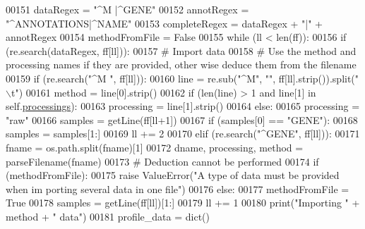 \begin{DoxyCode}
00151         dataRegex = \textcolor{stringliteral}{"^M |^GENE"}
00152         annotRegex = \textcolor{stringliteral}{"^ANNOTATIONS|^NAME"}
00153         completeRegex = dataRegex + \textcolor{stringliteral}{"|"} + annotRegex
00154         methodFromFile = \textcolor{keyword}{False}
00155         \textcolor{keywordflow}{while} (ll < len(ff)):
00156             \textcolor{keywordflow}{if} (re.search(dataRegex, ff[ll])):
00157                 \textcolor{comment}{# Import data}
00158                 \textcolor{comment}{# Use the method and processing names if they are provided, other
      wise deduce them from the filename }
00159                 \textcolor{keywordflow}{if} (re.search(\textcolor{stringliteral}{"^M "}, ff[ll])):
00160                     line = re.sub(\textcolor{stringliteral}{"^M"}, \textcolor{stringliteral}{""}, ff[ll].strip()).split(\textcolor{stringliteral}{"\(\backslash\)t"})
00161                     method = line[0].strip()
00162                     \textcolor{keywordflow}{if} (len(line) > 1 \textcolor{keywordflow}{and} line[1] \textcolor{keywordflow}{in} self.\hyperlink{classnavicom_1_1navicom_1_1NaviCom_a5a255d56e997ddcc653d8f06c741ea13}{processings}):
00163                         processing = line[1].strip()
00164                     \textcolor{keywordflow}{else}:
00165                         processing = \textcolor{stringliteral}{"raw"}
00166                     samples = getLine(ff[ll+1])
00167                     \textcolor{keywordflow}{if} (samples[0] == \textcolor{stringliteral}{"GENE"}):
00168                         samples = samples[1:]
00169                     ll += 2
00170                 \textcolor{keywordflow}{elif} (re.search(\textcolor{stringliteral}{"^GENE"}, ff[ll])):
00171                     fname = os.path.split(fname)[1]
00172                     dname, processing, method = parseFilename(fname)
00173                     \textcolor{comment}{# Deduction cannot be performed}
00174                     \textcolor{keywordflow}{if} (methodFromFile):
00175                         \textcolor{keywordflow}{raise} ValueError(\textcolor{stringliteral}{"A type of data must be provided when im
      porting several data in one file"})
00176                     \textcolor{keywordflow}{else}:
00177                         methodFromFile = \textcolor{keyword}{True}
00178                     samples = getLine(ff[ll])[1:]
00179                     ll += 1
00180                 \textcolor{keywordflow}{print}(\textcolor{stringliteral}{"Importing "} + method + \textcolor{stringliteral}{" data"})
00181                 profile\_data = dict()

\end{DoxyCode}
